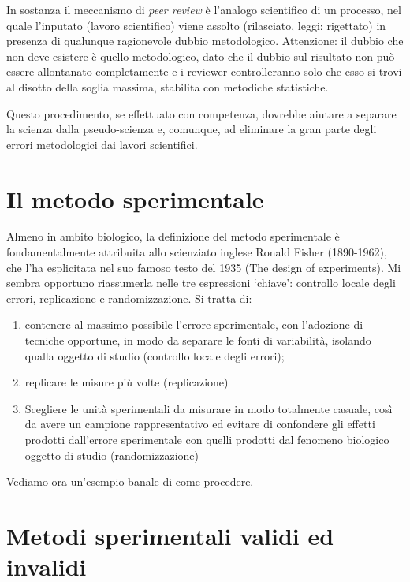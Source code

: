 \documentclass[a4paper,12pt,oneside]{book}
\providecommand{\tightlist}{%
  \setlength{\itemsep}{0pt}\setlength{\parskip}{0pt}}
\begin{document}
In sostanza il meccanismo di \emph{peer review} è l'analogo scientifico
di un processo, nel quale l'inputato (lavoro scientifico) viene assolto
(rilasciato, leggi: rigettato) in presenza di qualunque ragionevole
dubbio metodologico. Attenzione: il dubbio che non deve esistere è
quello metodologico, dato che il dubbio sul risultato non può essere
allontanato completamente e i reviewer controlleranno solo che esso si
trovi al disotto della soglia massima, stabilita con metodiche
statistiche.

Questo procedimento, se effettuato con competenza, dovrebbe aiutare a
separare la scienza dalla pseudo-scienza e, comunque, ad eliminare la
gran parte degli errori metodologici dai lavori scientifici.

\section{Il metodo sperimentale}\label{il-metodo-sperimentale}

Almeno in ambito biologico, la definizione del metodo sperimentale è
fondamentalmente attribuita allo scienziato inglese Ronald Fisher
(1890-1962), che l'ha esplicitata nel suo famoso testo del 1935 (The
design of experiments). Mi sembra opportuno riassumerla nelle tre
espressioni `chiave': controllo locale degli errori, replicazione e
randomizzazione. Si tratta di:

\begin{enumerate}
\def\labelenumi{\arabic{enumi}.}
\tightlist
\item
  contenere al massimo possibile l'errore sperimentale, con l'adozione
  di tecniche opportune, in modo da separare le fonti di variabilità,
  isolando qualla oggetto di studio (controllo locale degli errori);
\item
  replicare le misure più volte (replicazione)
\item
  Scegliere le unità sperimentali da misurare in modo totalmente
  casuale, così da avere un campione rappresentativo ed evitare di
  confondere gli effetti prodotti dall'errore sperimentale con quelli
  prodotti dal fenomeno biologico oggetto di studio (randomizzazione)
\end{enumerate}

Vediamo ora un'esempio banale di come procedere.

\section{Metodi sperimentali validi ed
invalidi}\label{metodi-sperimentali-validi-ed-invalidi}
\end{document}
